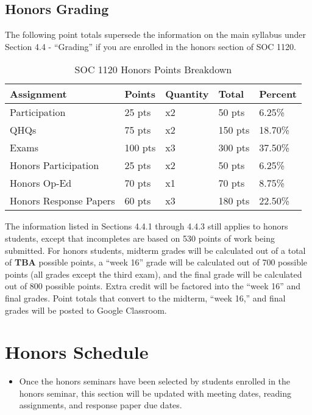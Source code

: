 \documentclass[]{book}
\newenvironment{rmdblock}[1]
  {\begin{shaded*}
  \begin{itemize}
  \renewcommand{\labelitemi}{
    \raisebox{-.7\height}[0pt][0pt]{
      {\setkeys{Gin}{width=3em,keepaspectratio}\texttt{[image: images/\#1]}}
    }
  }
  \item
  }
  {
  \end{itemize}
  \end{shaded*}
  }
\newenvironment{rmdwarning}
  {\begin{rmdblock}{warning}}
  {\end{rmdblock}}
\begin{document}
\hypertarget{honors-grading}{%
\section{Honors Grading}\label{honors-grading}}

The following point totals supersede the information on the main syllabus under Section 4.4 - ``Grading'' if you are enrolled in the honors section of SOC 1120.

\begin{table}

\caption{\label{tab:unnamed-chunk-5}SOC 1120 Honors Points Breakdown}
\centering
\begin{tabular}[t]{lllll}
\toprule
Assignment & Points & Quantity & Total & Percent\\
\midrule
Participation & 25 pts & x2 & 50 pts & 6.25\%\\
QHQs & 75 pts & x2 & 150 pts & 18.70\%\\
Exams & 100 pts & x3 & 300 pts & 37.50\%\\
Honors Participation & 25 pts & x2 & 50 pts & 6.25\%\\
Honors Op-Ed & 70 pts & x1 & 70 pts & 8.75\%\\
\addlinespace
Honors Response Papers & 60 pts & x3 & 180 pts & 22.50\%\\
\bottomrule
\end{tabular}
\end{table}

The information listed in Sections 4.4.1 through 4.4.3 still applies to honors students, except that incompletes are based on 530 points of work being submitted. For honors students, midterm grades will be calculated out of a total of \textbf{TBA} possible points, a ``week 16'' grade will be calculated out of 700 possible points (all grades except the third exam), and the final grade will be calculated out of 800 possible points. Extra credit will be factored into the ``week 16'' and final grades. Point totals that convert to the midterm, ``week 16,'' and final grades will be posted to Google Classroom.

\hypertarget{honors-schedule}{%
\chapter{Honors Schedule}\label{honors-schedule}}

\begin{rmdwarning}
Once the honors seminars have been selected by students enrolled in the
honors seminar, this section will be updated with meeting dates, reading
assignments, and response paper due dates.
\end{rmdwarning}


\end{document}
